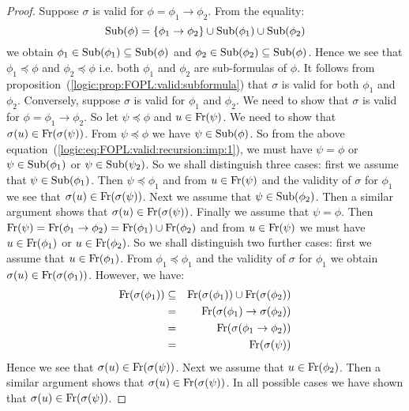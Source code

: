\begin{proof}
Suppose $\sigma$ is valid for $\phi=\phi_{1}\to\phi_{2}$. From the
equality:
    \begin{equation}\label{logic:eq:FOPL:valid:recursion:imp:1}
    \mbox{\rm Sub}(\phi)=\{\phi_{1}\to\phi_{2}\}\cup\mbox{\rm Sub}(\phi_{1})\cup\mbox{\rm Sub}(\phi_{2})
    \end{equation}
we obtain $\phi_{1}\in\mbox{\rm Sub}(\phi_{1})\subseteq\mbox{\rm Sub}(\phi)$ and
$\phi_{2}\in\mbox{\rm Sub}(\phi_{2})\subseteq\mbox{\rm Sub}(\phi)$. Hence we see that
$\phi_{1}\preceq\phi$ and $\phi_{2}\preceq\phi$ i.e. both $\phi_{1}$
and $\phi_{2}$ are sub-formulas of $\phi$. It follows from
proposition~(\ref{logic:prop:FOPL:valid:subformula}) that $\sigma$
is valid for both $\phi_{1}$ and $\phi_{2}$. Conversely, suppose
$\sigma$ is valid for $\phi_{1}$ and $\phi_{2}$. We need to show
that $\sigma$ is valid for $\phi=\phi_{1}\to\phi_{2}$. So let
$\psi\preceq\phi$ and $u\in\mbox{\rm Fr}(\psi)$. We need to show that
$\sigma(u)\in\mbox{\rm Fr}(\sigma(\psi))$. From $\psi\preceq\phi$ we have
$\psi\in\mbox{\rm Sub}(\phi)$. So from the above
equation~(\ref{logic:eq:FOPL:valid:recursion:imp:1}), we must have
$\psi=\phi$ or $\psi\in\mbox{\rm Sub}(\phi_{1})$ or $\psi\in\mbox{\rm Sub}(\psi_{2})$.
So we shall distinguish three cases: first we assume that
$\psi\in\mbox{\rm Sub}(\phi_{1})$. Then $\psi\preceq\phi_{1}$ and from
$u\in\mbox{\rm Fr}(\psi)$ and the validity of $\sigma$ for $\phi_{1}$ we see
that $\sigma(u)\in\mbox{\rm Fr}(\sigma(\psi))$. Next we assume that
$\psi\in\mbox{\rm Sub}(\phi_{2})$. Then a similar argument shows that
$\sigma(u)\in\mbox{\rm Fr}(\sigma(\psi))$. Finally we assume that
$\psi=\phi$. Then $\mbox{\rm Fr}(\psi) = \mbox{\rm Fr}(\phi_{1}\to\phi_{2})=
\mbox{\rm Fr}(\phi_{1})\cup\mbox{\rm Fr}(\phi_{2})$ and from $u\in\mbox{\rm Fr}(\psi)$ we
must have $u\in\mbox{\rm Fr}(\phi_{1})$ or $u\in\mbox{\rm Fr}(\phi_{2})$. So we
shall distinguish two further cases: first we assume that
$u\in\mbox{\rm Fr}(\phi_{1})$. From $\phi_{1}\preceq\phi_{1}$ and the
validity of $\sigma$ for $\phi_{1}$ we obtain
$\sigma(u)\in\mbox{\rm Fr}(\sigma(\phi_{1}))$. However, we have:
    \begin{eqnarray*}
    \mbox{\rm Fr}(\sigma(\phi_{1}))&\subseteq&\mbox{\rm Fr}(\sigma(\phi_{1}))\cup\mbox{\rm Fr}(\sigma(\phi_{2}))\\
    &=&\mbox{\rm Fr}(\sigma(\phi_{1})\to\sigma(\phi_{2}))\\
    &=&\mbox{\rm Fr}(\sigma(\phi_{1}\to\phi_{2}))\\
    &=&\mbox{\rm Fr}(\sigma(\psi))
    \end{eqnarray*}
Hence we see that $\sigma(u)\in\mbox{\rm Fr}(\sigma(\psi))$. Next we assume
that $u\in\mbox{\rm Fr}(\phi_{2})$. Then a similar argument shows that
$\sigma(u)\in\mbox{\rm Fr}(\sigma(\psi))$. In all possible cases we have
shown that $\sigma(u)\in\mbox{\rm Fr}(\sigma(\psi))$.
\end{proof}


